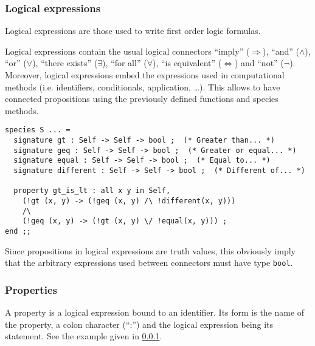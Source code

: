 \subsubsection{Logical expressions}
\label{logical-expressions}
Logical expressions are those used to write first order logic
formulas.
\begin{syn}
 \is
        
     \tok{,} 
\alt {}   
     \tok{,} 
\alt {} \tok{->} 
\alt {} \tok{<->} 
\alt {} \tok{/\backslash} 
\alt {} \tok{\backslash/} 
\alt \tok{\tilde} 
\alt {}
\alt \tok{(}  \tok{)}
\end{syn}


 Logical expressions contain the usual logical connectors ``imply''
($\Rightarrow$), ``and'' ($\wedge$), ``or'' ($\vee$), ``there exists''
($\exists$), ``for all'' ($\forall$), ``is equivalent''
($\Leftrightarrow$) and ``not'' ($\neg$). Moreover, logical
expressions embed the {\focal} expressions used in computational
methods (i.e. identifiers, conditionals, application, \ldots). This
allows to have connected propositions using the previously defined
functions and species methods.

{\scriptsize
\begin{lstlisting}
species S ... =
  signature gt : Self -> Self -> bool ;  (* Greater than... *)
  signature geq : Self -> Self -> bool ;  (* Greater or equal... *)
  signature equal : Self -> Self -> bool ;  (* Equal to... *)
  signature different : Self -> Self -> bool ;  (* Different of... *)

  property gt_is_lt : all x y in Self,
    (!gt (x, y) -> (!geq (x, y) /\ !different(x, y)))
    /\
    (!geq (x, y) -> (!gt (x, y) \/ !equal(x, y))) ;
end ;;
\end{lstlisting}}

Since  propositions in logical expressions are truth values, this
obviously imply that the arbitrary expressions used between connectors
must have type {\tt bool}.



\subsubsection{Properties}
A property is  a logical expression bound to an identifier. Its
form is the name of the property, a colon character (``:'') and the
logical expression being its statement. See the example given in
\ref{logical-expressions}.
\begin{syn}
 \is
    \tok{:} 
\end{syn}


